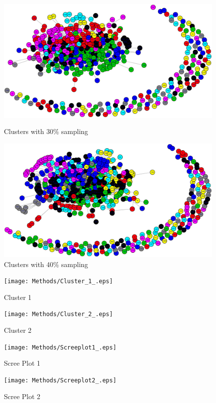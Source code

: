 \begin{figure}[htb]
\centering
\begin{minipage}{0.45\linewidth}
\includegraphics[scale=0.2]{Methods/30percent.eps}
\caption{Clusters with 30\% sampling}
\end{minipage}
\quad
\begin{minipage}{0.45\linewidth}
\includegraphics[scale=0.2]{Methods/40percent.eps}
\caption{Clusters with 40\% sampling}
\end{minipage}
\end{figure}
\pagebreak

\begin{figure}[htb]
\centering
\begin{minipage}{0.45\linewidth}
\texttt{[image: Methods/Cluster\_1\_.eps]}
\caption{Cluster 1}
\end{minipage}
\quad
\begin{minipage}{0.45\linewidth}
\texttt{[image: Methods/Cluster\_2\_.eps]}
\caption{Cluster 2}
\end{minipage}
\end{figure}
\pagebreak

\begin{figure}[htb]
\centering
\begin{minipage}{0.45\linewidth}
\texttt{[image: Methods/Screeplot1\_.eps]}
\caption{Scree Plot 1}
\end{minipage}
\quad
\begin{minipage}{0.45\linewidth}
\texttt{[image: Methods/Screeplot2\_.eps]}
\caption{Scree Plot 2}
\end{minipage}
\end{figure}
\pagebreak

